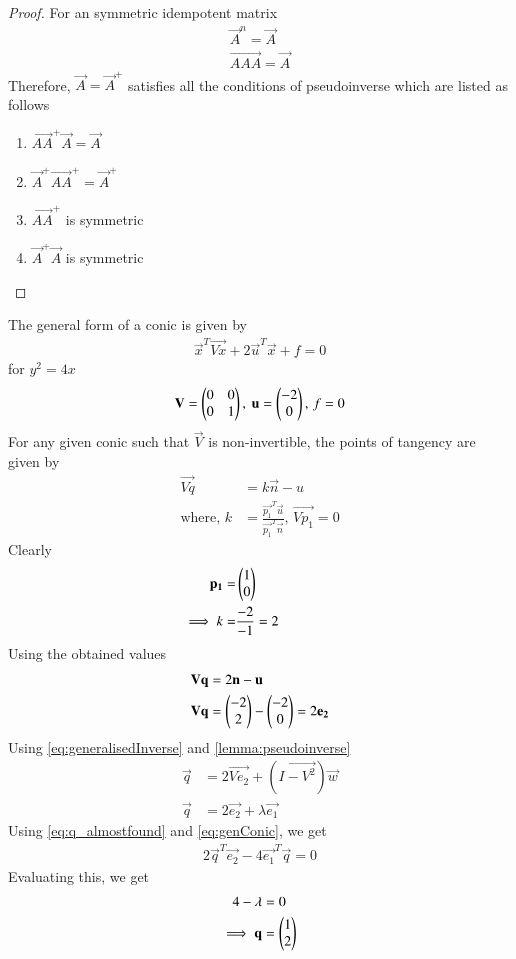 \documentclass[journal,12pt,twocolumn]{IEEEtran}
\begin{document}
\begin{proof}
    For an symmetric idempotent matrix
    \begin{align}
        \vec{A}^n=\vec{A}\\
        \vec{AAA}=\vec{A}
    \end{align}
    Therefore, $\vec{A}=\vec{A}^+$ satisfies all the conditions of pseudoinverse which are listed as follows
\begin{enumerate}
    \item $\vec{AA}^+\vec{A}=\vec{A}$
    \item $\vec{A}^+\vec{AA}^+=\vec{A}^+$
    \item $\vec{AA}^+$ is symmetric
    \item $\vec{A}^+\vec{A}$ is symmetric
\end{enumerate}
\end{proof}

The general form of a conic is given by
\begin{align}
    \vec{x}^T\vec{Vx}+2\vec{u}^T\vec{x}+f=0 \label{eq:genConic}
\end{align}
for $y^2=4x$
\begin{align}
\mathbf{V}=\begin{pmatrix}0 & 0 \\ 0 & 1\end{pmatrix},\ \mathbf{u}=\begin{pmatrix}-2 \\0\end{pmatrix},\, f=0
\end{align}
For any given conic such that $\vec{V}$ is non-invertible, the points of tangency are given by
\begin{align}
    \vec{Vq}&=k\vec{n}-u \\
    \text{where},\, k& = \frac{\vec{p_1}^T\vec{u}}{\vec{p_1}^T\vec{n}},\, \vec{Vp_1}=0
\end{align}
Clearly
\begin{align}
    \mathbf{p_1} =&\begin{pmatrix}1\\0\end{pmatrix} \hspace{2.0cm} \\
    \implies k  =&\frac{-2}{-1}=2
\end{align}
Using the obtained values
\begin{align}
    &\mathbf{Vq}=2\mathbf{n}-\mathbf{u}\\
    &\mathbf{Vq}=\begin{pmatrix}-2\\2\end{pmatrix}-\begin{pmatrix}-2\\0\end{pmatrix}=2\mathbf{e_2}
\end{align}
Using \eqref{eq:generalisedInverse} and \eqref{lemma:pseudoinverse}
\begin{align}
    \vec{q}&=2\vec{Ve_2}+(\vec{I-V^2})\vec{w}\\
    \vec{q}&=2\vec{e_2}+\lambda\vec{e_1} \label{eq:q_almostfound}
\end{align}
Using \eqref{eq:q_almostfound} and \eqref{eq:genConic}, we get
\begin{align}
    2\vec{q}^T\vec{e_2}-4\vec{e_1}^T\vec{q}=0
\end{align}
Evaluating this, we get
\begin{align}
    4-\lambda&=0 \\
    \implies \mathbf{q}&=\begin{pmatrix}1\\2\end{pmatrix}
\end{align}
\end{document}
